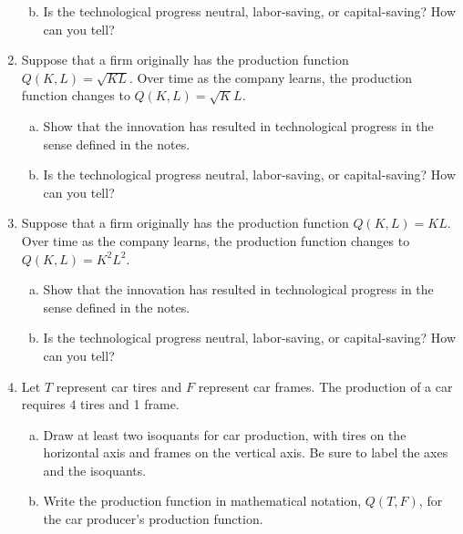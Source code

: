 \documentclass[11pt]{article}
\begin{document}
\begin{enumerate}
\begin{enumerate}[(a)]
    \vspace*{40mm}
    \item Is the technological progress neutral, labor-saving, or capital-saving? How can you tell?
  \end{enumerate}

  \vspace*{40mm}
  \item Suppose that a firm originally has the production function $Q(K, L) = \sqrt{KL}$. Over time as the company learns, the production function changes to $Q(K, L) = \sqrt{K} L$.
  
  \begin{enumerate}[(a)]
    \item Show that the innovation has resulted in technological progress in the sense defined in the notes.
    
    \vspace*{40mm}
    \item Is the technological progress neutral, labor-saving, or capital-saving? How can you tell?
  \end{enumerate}

  \newpage
  \item Suppose that a firm originally has the production function $Q(K, L) = KL$. Over time as the company learns, the production function changes to $Q(K, L) = K^2 L^2$.
  
  \begin{enumerate}[(a)]
    \item Show that the innovation has resulted in technological progress in the sense defined in the notes.
    
    \vspace*{40mm}
    \item Is the technological progress neutral, labor-saving, or capital-saving? How can you tell?
  \end{enumerate}

  \newpage
  \item Let $T$ represent car tires and $F$ represent car frames. The production of a car requires 4 tires and 1 frame. 
  \begin{enumerate}[(a)]
    \item Draw at least two isoquants for car production, with tires on the horizontal axis and frames on the vertical axis. Be sure to label the axes and the isoquants.
    
    \vspace*{100mm}
    \item Write the production function in mathematical notation, $Q(T, F)$, for the car producer's production function.
  \end{enumerate}
\end{enumerate}
\end{document}
